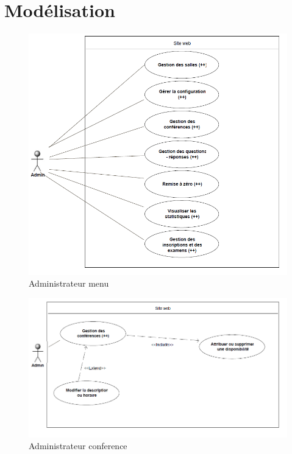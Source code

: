 \chapter{Modélisation}

    \begin{figure}[h]
        \begin{center}
            \includegraphics[scale=0.75]{images/uml/adminMenu.png} 
        \end{center}

        \caption{Administrateur menu}
        \label{a=Administrateur menu}
    \end{figure}

    \begin{figure}[h]
        \begin{center}
            \includegraphics[scale=0.75]{images/uml/adminConference.png} 
        \end{center}

        \caption{Administrateur conference}
        \label{Administrateur conference}
    \end{figure}

